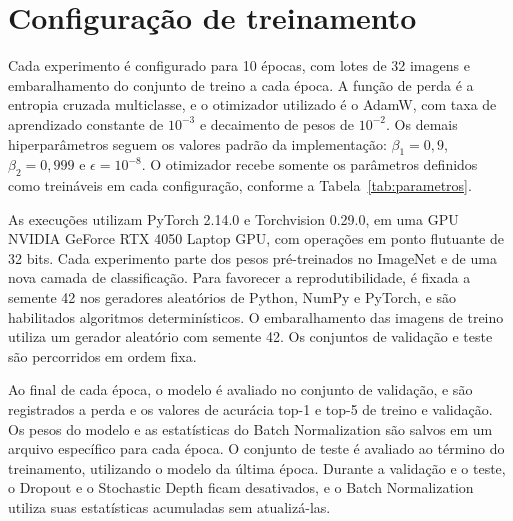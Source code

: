 \section{Configuração de treinamento}
\label{sec:treinamento}

Cada experimento é configurado para 10 épocas, com lotes de 32 imagens e
embaralhamento do conjunto de treino a cada época. A função de perda é a
entropia cruzada multiclasse, e o otimizador utilizado é o AdamW, com taxa
de aprendizado constante de $10^{-3}$ e decaimento de pesos de $10^{-2}$.
Os demais hiperparâmetros seguem os valores padrão da implementação:
$\beta_1=0{,}9$, $\beta_2=0{,}999$ e $\epsilon=10^{-8}$. O otimizador recebe
somente os parâmetros definidos como treináveis em cada configuração,
conforme a Tabela~\ref{tab:parametros}.

As execuções utilizam PyTorch 2.14.0 e Torchvision 0.29.0, em uma GPU
NVIDIA GeForce RTX 4050 Laptop GPU, com operações em ponto flutuante de
32 bits. Cada experimento parte dos pesos pré-treinados no ImageNet e
de uma nova camada de classificação. Para favorecer a reprodutibilidade,
é fixada a semente 42 nos geradores aleatórios de Python, NumPy e PyTorch,
e são habilitados algoritmos determinísticos. O embaralhamento das imagens
de treino utiliza um gerador aleatório com semente 42. Os conjuntos de
validação e teste são percorridos em ordem fixa.

Ao final de cada época, o modelo é avaliado no conjunto de validação, e
são registrados a perda e os valores de acurácia top-1 e top-5 de treino e
validação. Os pesos do modelo e as estatísticas do Batch Normalization são
salvos em um arquivo específico para cada época. O conjunto de teste é
avaliado ao término do treinamento, utilizando o modelo da última época.
Durante a validação e o teste, o Dropout e o Stochastic Depth ficam
desativados, e o Batch Normalization utiliza suas estatísticas acumuladas
sem atualizá-las.
